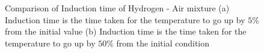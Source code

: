 \documentclass{warpdoc}
\begin{document}
\begin{figure}[!t]
\centering     %
{}
\caption{Comparison of Induction time of Hydrogen - Air mixture (a) Induction time is the time taken for the temperature to go up by $5\%$ from the initial value (b) Induction time is the time taken for the temperature to go up by $50\%$ from the initial condition}
\label{fig:Induction_time_comparison}
\end{figure}






~
\newpage
~
\newpage
~
\newpage
~
\newpage





\end{document}
